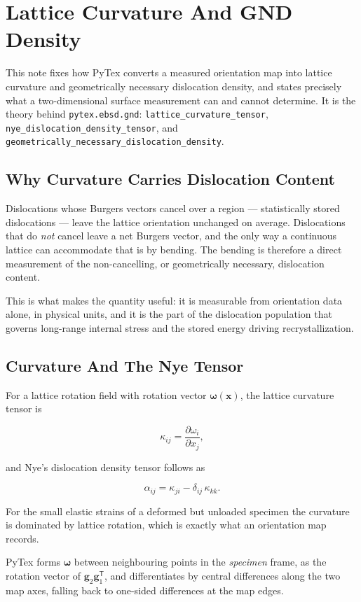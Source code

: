 \section{Lattice Curvature And GND Density}

This note fixes how PyTex converts a measured orientation map into lattice
curvature and geometrically necessary dislocation density, and states precisely
what a two-dimensional surface measurement can and cannot determine. It is the
theory behind \texttt{pytex.ebsd.gnd}:
\texttt{lattice\_curvature\_tensor},
\texttt{nye\_dislocation\_density\_tensor}, and
\texttt{geometrically\_necessary\_dislocation\_density}.

\subsection{Why Curvature Carries Dislocation Content}

Dislocations whose Burgers vectors cancel over a region --- statistically stored
dislocations --- leave the lattice orientation unchanged on average. Dislocations
that do \emph{not} cancel leave a net Burgers vector, and the only way a
continuous lattice can accommodate that is by bending. The bending is therefore a
direct measurement of the non-cancelling, or geometrically necessary,
dislocation content.

This is what makes the quantity useful: it is measurable from orientation data
alone, in physical units, and it is the part of the dislocation population that
governs long-range internal stress and the stored energy driving
recrystallization.

\subsection{Curvature And The Nye Tensor}

For a lattice rotation field with rotation vector
$\boldsymbol{\omega}(\mathbf{x})$, the lattice curvature tensor is

\[
  \kappa_{ij} = \frac{\partial \omega_i}{\partial x_j},
\]

and Nye's dislocation density tensor follows as

\[
  \alpha_{ij} = \kappa_{ji} - \delta_{ij}\,\kappa_{kk}.
\]

For the small elastic strains of a deformed but unloaded specimen the curvature
is dominated by lattice rotation, which is exactly what an orientation map
records.

PyTex forms $\boldsymbol{\omega}$ between neighbouring points in the
\emph{specimen} frame, as the rotation vector of
$\mathbf{g}_{2}\mathbf{g}_{1}^{\mathsf{T}}$, and differentiates by central
differences along the two map axes, falling back to one-sided differences at the
map edges.

